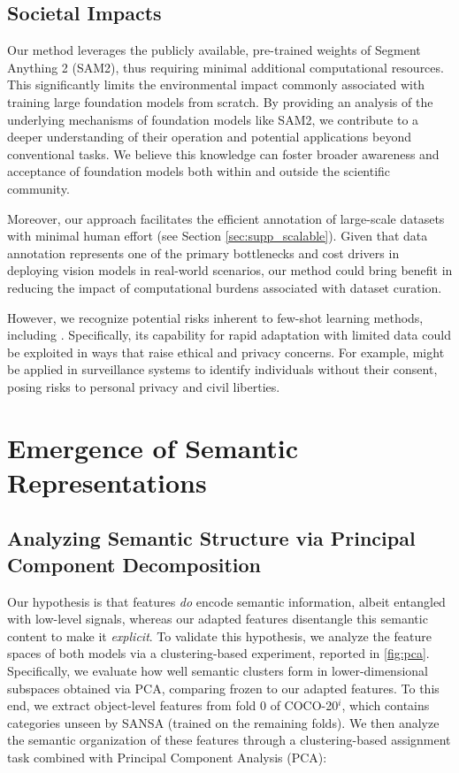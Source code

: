\subsection{Societal Impacts}
Our method leverages the publicly available, pre-trained weights of Segment Anything 2 (SAM2), thus requiring minimal additional computational resources. This significantly limits the environmental impact commonly associated with training large foundation models from scratch. By providing an analysis of the underlying mechanisms of foundation models like SAM2, we contribute to a deeper understanding of their operation and potential applications beyond conventional tasks. We believe this knowledge 
can foster broader awareness and acceptance of foundation models both within and outside the scientific community.

Moreover, our approach facilitates the efficient annotation of large-scale datasets with minimal human effort (see Section \ref{sec:supp_scalable}). Given that data annotation represents one of the primary bottlenecks and cost drivers in deploying vision models in real-world scenarios, our method could bring benefit in reducing the impact of computational burdens associated with dataset curation.

However, we recognize potential risks inherent to few-shot learning methods, including \ours{}. Specifically, its capability for rapid adaptation with limited data could be exploited in ways that raise ethical and privacy concerns. For example, \ours{} might be applied in surveillance systems to identify individuals without their consent, posing risks to personal privacy and civil liberties. 

\section{Emergence of Semantic Representations}
\label{sec:supp_emergence}
\subsection{Analyzing Semantic Structure via Principal Component Decomposition}

Our hypothesis is that \sam{} features \textit{do} encode semantic information, albeit entangled with low-level signals, whereas our adapted \ours{} features disentangle this semantic content to make it \textit{explicit}. To validate this hypothesis, we analyze the feature spaces of both models via a clustering-based experiment, reported in \cref{fig:pca}. Specifically, we evaluate how well semantic clusters form in lower-dimensional subspaces obtained via PCA, comparing frozen \sam{} to our adapted \ours{} features.
To this end, we extract object-level features from fold 0 of COCO-20$^i$, which contains categories unseen by SANSA (trained on the remaining folds). We then analyze the semantic organization of these features through a clustering-based assignment task combined with Principal Component Analysis (PCA):

